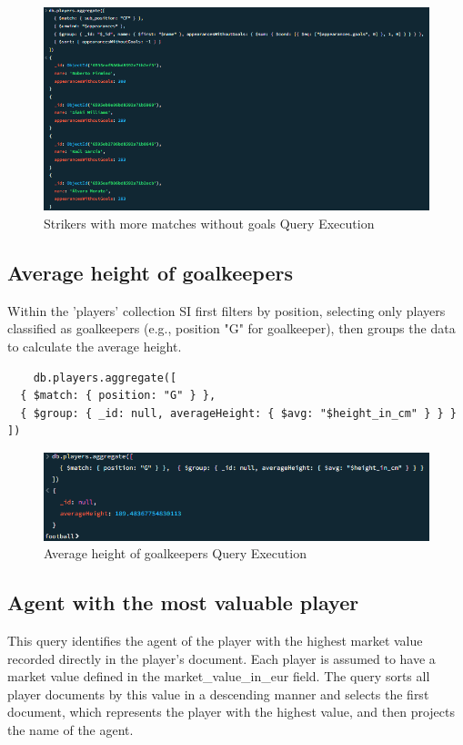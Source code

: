 \documentclass{Configuration_Files/PoliMi3i_thesis}
\begin{document}
\begin{figure}[htbp]
    \centering
    \includegraphics[scale=1]{Images/Queries/Strikers_without_goals/swg.png}
    \caption{Strikers with more matches without goals Query Execution}
\end{figure}

\subsection{Average height of goalkeepers}
Within the 'players' collection SI first filters by position, selecting only players classified as goalkeepers (e.g., position "G" for goalkeeper), then groups the data to calculate the average height.
\begin{verbatim}
    db.players.aggregate([
  { $match: { position: "G" } },  
  { $group: { _id: null, averageHeight: { $avg: "$height_in_cm" } } }
])
\end{verbatim}

\begin{figure}[htbp]
    \centering
    \includegraphics[scale=1]{Images/Queries/Avg_goalkeepers_height/agh.png}
    \caption{Average height of goalkeepers Query Execution}
\end{figure}

\subsection{Agent with the most valuable player}
This query identifies the agent of the player with the highest market value recorded directly in the player's document. Each player is assumed to have a market value defined in the market\_value\_in\_eur field. The query sorts all player documents by this value in a descending manner and selects the first document, which represents the player with the highest value, and then projects the name of the agent.
\end{document}
